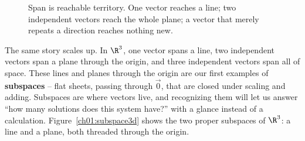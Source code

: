 \begin{figure}[H]
\centering
{}
\caption{Span is reachable territory. One vector reaches a line; two independent vectors reach the
whole plane; a vector that merely repeats a direction reaches nothing new.}
\label{ch01:span}
\end{figure}

The same story scales up. In $\R^3$, one vector spans a line, two independent vectors span a plane
through the origin, and three independent vectors span all of space. These lines and planes through
the origin are our first examples of \textbf{subspaces} -- flat sheets, passing through $\vec 0$, that
are closed under scaling and adding. Subspaces are where vectors live, and recognizing them will let
us answer ``how many solutions does this system have?'' with a glance instead of a calculation.
Figure~\ref{ch01:subspace3d} shows the two proper subspaces of $\R^3$: a line and a plane, both
threaded through the origin.

